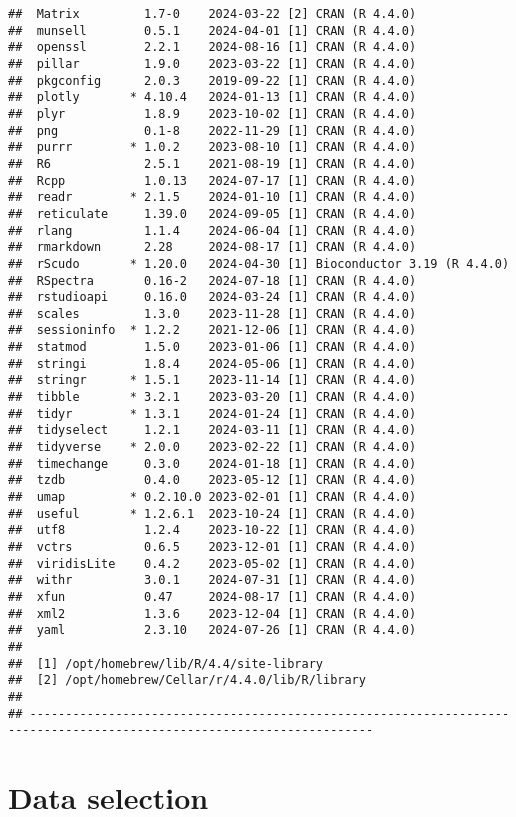 \documentclass[
]{article}
\begin{document}
\begin{verbatim}
##  Matrix         1.7-0    2024-03-22 [2] CRAN (R 4.4.0)
##  munsell        0.5.1    2024-04-01 [1] CRAN (R 4.4.0)
##  openssl        2.2.1    2024-08-16 [1] CRAN (R 4.4.0)
##  pillar         1.9.0    2023-03-22 [1] CRAN (R 4.4.0)
##  pkgconfig      2.0.3    2019-09-22 [1] CRAN (R 4.4.0)
##  plotly       * 4.10.4   2024-01-13 [1] CRAN (R 4.4.0)
##  plyr           1.8.9    2023-10-02 [1] CRAN (R 4.4.0)
##  png            0.1-8    2022-11-29 [1] CRAN (R 4.4.0)
##  purrr        * 1.0.2    2023-08-10 [1] CRAN (R 4.4.0)
##  R6             2.5.1    2021-08-19 [1] CRAN (R 4.4.0)
##  Rcpp           1.0.13   2024-07-17 [1] CRAN (R 4.4.0)
##  readr        * 2.1.5    2024-01-10 [1] CRAN (R 4.4.0)
##  reticulate     1.39.0   2024-09-05 [1] CRAN (R 4.4.0)
##  rlang          1.1.4    2024-06-04 [1] CRAN (R 4.4.0)
##  rmarkdown      2.28     2024-08-17 [1] CRAN (R 4.4.0)
##  rScudo       * 1.20.0   2024-04-30 [1] Bioconductor 3.19 (R 4.4.0)
##  RSpectra       0.16-2   2024-07-18 [1] CRAN (R 4.4.0)
##  rstudioapi     0.16.0   2024-03-24 [1] CRAN (R 4.4.0)
##  scales         1.3.0    2023-11-28 [1] CRAN (R 4.4.0)
##  sessioninfo  * 1.2.2    2021-12-06 [1] CRAN (R 4.4.0)
##  statmod        1.5.0    2023-01-06 [1] CRAN (R 4.4.0)
##  stringi        1.8.4    2024-05-06 [1] CRAN (R 4.4.0)
##  stringr      * 1.5.1    2023-11-14 [1] CRAN (R 4.4.0)
##  tibble       * 3.2.1    2023-03-20 [1] CRAN (R 4.4.0)
##  tidyr        * 1.3.1    2024-01-24 [1] CRAN (R 4.4.0)
##  tidyselect     1.2.1    2024-03-11 [1] CRAN (R 4.4.0)
##  tidyverse    * 2.0.0    2023-02-22 [1] CRAN (R 4.4.0)
##  timechange     0.3.0    2024-01-18 [1] CRAN (R 4.4.0)
##  tzdb           0.4.0    2023-05-12 [1] CRAN (R 4.4.0)
##  umap         * 0.2.10.0 2023-02-01 [1] CRAN (R 4.4.0)
##  useful       * 1.2.6.1  2023-10-24 [1] CRAN (R 4.4.0)
##  utf8           1.2.4    2023-10-22 [1] CRAN (R 4.4.0)
##  vctrs          0.6.5    2023-12-01 [1] CRAN (R 4.4.0)
##  viridisLite    0.4.2    2023-05-02 [1] CRAN (R 4.4.0)
##  withr          3.0.1    2024-07-31 [1] CRAN (R 4.4.0)
##  xfun           0.47     2024-08-17 [1] CRAN (R 4.4.0)
##  xml2           1.3.6    2023-12-04 [1] CRAN (R 4.4.0)
##  yaml           2.3.10   2024-07-26 [1] CRAN (R 4.4.0)
## 
##  [1] /opt/homebrew/lib/R/4.4/site-library
##  [2] /opt/homebrew/Cellar/r/4.4.0/lib/R/library
## 
## ----------------------------------------------------------------------------------------------------------------------
\end{verbatim}

\section{Data selection}\label{data-selection}
\end{document}
